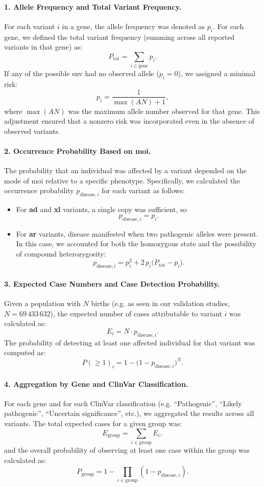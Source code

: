 \paragraph{1. Allele Frequency and Total Variant Frequency.} \label{sec:min_risk}
For each variant \(i\) in a gene, the allele frequency was denoted as \(p_i\). For each gene, we defined the total variant frequency (summing across all reported variants in that gene) as:
\[
P_{\text{tot}} = \sum_{i \in \text{gene}} p_i.
\]
If any of the possible \ac{snv}  had no observed allele (\(p_i = 0\)), we assigned a minimal risk:
\[
p_i = \frac{1}{\max(AN) + 1},
\]
where \(\max(AN)\) was the maximum allele number observed for that gene. This adjustment ensured that a nonzero risk was incorporated even in the absence of observed variants.
\paragraph{2. Occurrence Probability Based on \ac{moi}.}
The probability that an individual was affected by a variant depended on the mode of \ac{moi} relative to a specific phenotype. Specifically, we calculated the occurrence probability \(p_{\text{disease},i}\) for each variant as follows:
\begin{itemize}
    \item For \textbf{\ac{ad}} and \textbf{\ac{xl}} variants, a single copy was sufficient, so
    \[
    p_{\text{disease},i} = p_i.
    \]
    \item For \textbf{\ac{ar}} variants, disease manifested when two pathogenic alleles were present. In this case, we accounted for both the homozygous state and the possibility of compound heterozygosity:
    \[
    p_{\text{disease},i} = p_i^2 + 2\,p_i\bigl(P_{\text{tot}} - p_i\bigr).
    \]
\end{itemize}

\paragraph{3. Expected Case Numbers and Case Detection Probability.}
Given a population with \(N\) births (e.g. as seen in our validation studies, \(N = 69\,433\,632\)), the expected number of cases attributable to variant \(i\) was calculated as:
\[
E_i = N \cdot p_{\text{disease},i}.
\]
The probability of detecting at least one affected individual for that variant was computed as:
\[
P(\geq 1)_i = 1 - \bigl(1 - p_{\text{disease},i}\bigr)^N.
\]

\paragraph{4. Aggregation by Gene and ClinVar Classification.}
For each gene and for each ClinVar classification (e.g. “Pathogenic”, “Likely pathogenic”, “Uncertain significance”, etc.), we aggregated the results across all variants. The total expected cases for a given group was:
\[
E_{\text{group}} = \sum_{i \in \text{group}} E_i,
\]
and the overall probability of observing at least one case within the group was calculated as:
\[
P_{\text{group}} = 1 - \prod_{i \in \text{group}} \left(1 - p_{\text{disease},i}\right).
\]

